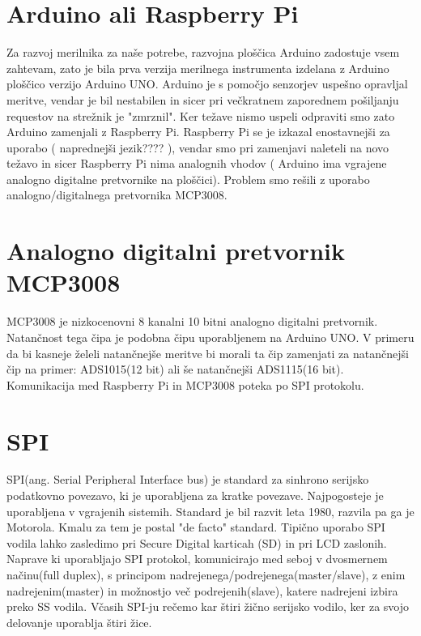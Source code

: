 \documentclass[12pt,a4paper,titlepage,openany]{report}
\begin{document}
\section{Arduino ali Raspberry Pi}
Za razvoj merilnika za naše potrebe, razvojna ploščica Arduino zadostuje vsem zahtevam, zato je bila prva verzija merilnega instrumenta izdelana z Arduino ploščico verzijo Arduino UNO. Arduino je s pomočjo senzorjev uspešno opravljal meritve, vendar je bil nestabilen in sicer pri večkratnem zaporednem pošiljanju requestov na strežnik  je "zmrznil". Ker težave nismo uspeli odpraviti smo zato Arduino zamenjali z Raspberry Pi. Raspberry Pi se je izkazal enostavnejši za uporabo ( naprednejši jezik???? ), vendar smo pri zamenjavi naleteli na novo težavo in sicer Raspberry Pi nima analognih vhodov ( Arduino ima vgrajene analogno digitalne pretvornike na ploščici). Problem smo rešili z uporabo analogno/digitalnega pretvornika MCP3008.

\section{Analogno digitalni pretvornik MCP3008}
MCP3008 je nizkocenovni 8 kanalni 10 bitni analogno digitalni pretvornik. Natančnost tega čipa je podobna čipu uporabljenem na Arduino UNO. V primeru da bi kasneje želeli natančnejše meritve bi morali ta čip zamenjati za natančnejši čip na primer: ADS1015(12 bit) ali še natančnejši ADS1115(16 bit). Komunikacija med Raspberry Pi in MCP3008 poteka po SPI protokolu.

\section{SPI}
SPI(ang. Serial Peripheral Interface bus) je standard za sinhrono serijsko podatkovno povezavo, ki je uporabljena za kratke povezave. Najpogosteje je uporabljena v vgrajenih sistemih. Standard je bil razvit leta 1980, razvila pa ga je Motorola. Kmalu za tem je postal "de facto" standard. Tipično uporabo SPI vodila lahko zasledimo pri Secure Digital karticah (SD) in pri LCD zaslonih. Naprave ki uporabljajo SPI protokol, komunicirajo med seboj v dvosmernem načinu(full duplex), s principom nadrejenega/podrejenega(master/slave), z enim nadrejenim(master) in možnostjo več podrejenih(slave), katere nadrejeni izbira preko SS vodila. Včasih SPI-ju rečemo kar štiri žično serijsko vodilo, ker za svojo delovanje uporablja štiri žice.
\end{document}

